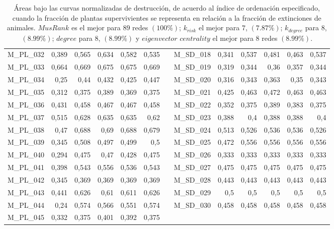 \begin{table}[hp]
\begin{adjustbox}{angle=90}
\begin{tabular}{lrrrrrrrrrrrr}
    M\_PL\_032 & 0,389 & 0,565 & 0,634 & 0,582 & 0,535 &      & M\_SD\_018 & 0,341 & 0,537 & 0,481 & 0,463 & 0,537 \\
    M\_PL\_033 & 0,664 & 0,669 & 0,675 & 0,675 & 0,669 &      & M\_SD\_019 & 0,319 & 0,344 & 0,36 & 0,357 & 0,344 \\
    M\_PL\_034 & 0,25 & 0,44 & 0,432 & 0,425 & 0,447 &      & M\_SD\_020 & 0,316 & 0,343 & 0,363 & 0,35 & 0,343 \\
    M\_PL\_035 & 0,312 & 0,375 & 0,389 & 0,369 & 0,375 &      & M\_SD\_021 & 0,425 & 0,463 & 0,472 & 0,463 & 0,463 \\
    M\_PL\_036 & 0,431 & 0,458 & 0,467 & 0,467 & 0,458 &      & M\_SD\_022 & 0,352 & 0,375 & 0,389 & 0,383 & 0,375 \\
    M\_PL\_037 & 0,515 & 0,628 & 0,635 & 0,635 & 0,62 &      & M\_SD\_023 & 0,388 & 0,4  & 0,388 & 0,388 & 0,4 \\
    M\_PL\_038 & 0,47 & 0,688 & 0,69 & 0,688 & 0,679 &      & M\_SD\_024 & 0,513 & 0,526 & 0,536 & 0,536 & 0,526 \\
    M\_PL\_039 & 0,345 & 0,508 & 0,497 & 0,499 & 0,5  &      & M\_SD\_025 & 0,472 & 0,556 & 0,556 & 0,556 & 0,556 \\
    M\_PL\_040 & 0,294 & 0,475 & 0,47 & 0,428 & 0,475 &      & M\_SD\_026 & 0,333 & 0,333 & 0,333 & 0,333 & 0,333 \\
    M\_PL\_041 & 0,398 & 0,543 & 0,556 & 0,536 & 0,543 &      & M\_SD\_027 & 0,475 & 0,475 & 0,475 & 0,475 & 0,475 \\
    M\_PL\_042 & 0,345 & 0,369 & 0,369 & 0,369 & 0,369 &      & M\_SD\_028 & 0,443 & 0,443 & 0,443 & 0,443 & 0,443 \\
    M\_PL\_043 & 0,441 & 0,626 & 0,61 & 0,611 & 0,626 &      & M\_SD\_029 & 0,5  & 0,5  & 0,5  & 0,5  & 0,5 \\
    M\_PL\_044 & 0,24 & 0,574 & 0,566 & 0,551 & 0,574 &      & M\_SD\_030 & 0,458 & 0,458 & 0,458 & 0,458 & 0,458 \\
    M\_PL\_045 & 0,332 & 0,375 & 0,401 & 0,392 & 0,375 &      &      &      &      &      &      &  \\
    \bottomrule
    \end{tabular}%
    \end{adjustbox}
    \caption{\label{table:dunne_destruction} Áreas bajo las curvas normalizadas de destrucción, de acuerdo al índice de ordenación especificado, cuando la fracción de plantas supervivientes se representa en relación a la fracción de extinciones de animales. $MusRank$ es el mejor para $89$ redes $(100\%)$;
$k_{risk}$ el mejor para $7$, $(7.87\%)$; $k_{degree}$ para $8$, $(8.99\%)$; $degree$ para $8$, $(8.99\%)$ y
$eigenvector$ $centrality$ el mejor para $8$ redes $(8.99\%)$.}
\end{table}%

